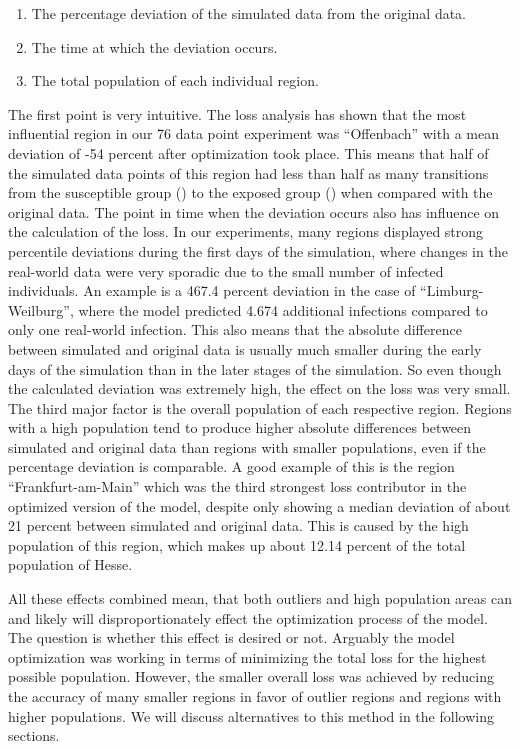 \begin{enumerate}[label=\arabic*.]
	\item The percentage deviation of the simulated data from the original data.
	\item The time at which the deviation occurs.
	\item The total population of each individual region.
\end{enumerate}

The first point is very intuitive. The loss analysis has shown that the most influential region in our 76 data point experiment was ``Offenbach'' with
a mean deviation of -54 percent after optimization took place. This means that half of the simulated data points of this region
had less than half as many transitions from the susceptible group () to the exposed group () when compared with 
the original data.
The point in time when the deviation occurs also has influence on the calculation of the loss. In our experiments, many regions
displayed strong percentile deviations during the first days of the simulation, where changes in the real-world data were very
sporadic due to the small number of infected individuals. An example is a 467.4 percent deviation
in the case of ``Limburg-Weilburg'', where the model predicted 4.674 additional infections compared to only one real-world infection.
This also means that the absolute difference between simulated and original data is usually much
smaller during the early days of the simulation than in the later stages of the simulation. So even though the
calculated deviation was extremely high, the effect on the loss was very small.
The third major factor is the overall population of each respective region. Regions with a high population tend to
produce higher absolute differences between simulated and original data than regions with smaller populations, even if the percentage
deviation is comparable.  A good example of this
is the region ``Frankfurt-am-Main'' which was the third strongest loss contributor in the optimized version of the model, despite
only showing a median deviation of about 21 percent between simulated and original data. This is caused by the high population of
this region, which makes up about 12.14 percent of the total population of Hesse.\newline

All these effects combined mean, that both outliers and high population areas can and likely will disproportionately effect the
optimization process of the model. The question is whether this effect is desired or not. Arguably the model optimization was
working in terms of minimizing the total loss for the highest possible population. However, the smaller overall loss was achieved by
reducing the accuracy of many smaller regions in favor of outlier regions and regions with higher populations. We will discuss alternatives to this method in the
following sections.

